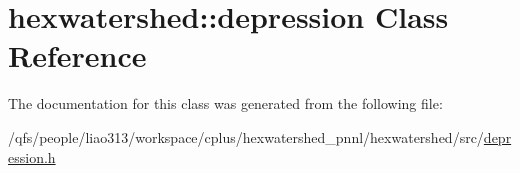 \hypertarget{classhexwatershed_1_1depression}{\section{hexwatershed\-:\-:depression Class Reference}
\label{classhexwatershed_1_1depression}
}


The documentation for this class was generated from the following file\-:\begin{DoxyCompactItemize}
\item 
/qfs/people/liao313/workspace/cplus/hexwatershed\-\_\-pnnl/hexwatershed/src/\hyperlink{depression_8h}{depression.\-h}\end{DoxyCompactItemize}
